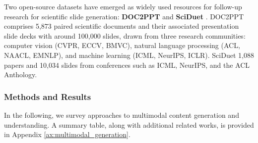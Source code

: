 Two open-source datasets have emerged as widely used resources for follow-up research for scientific slide generation: \textbf{DOC2PPT} \citep{Fu2021DOC2PPTAP} and \textbf{SciDuet} \citep{sun-etal-2021-d2s}. DOC2PPT \citep{Fu2021DOC2PPTAP}  comprises 5,873 paired scientific documents and their associated presentation slide decks with around  100,000 slides, drawn from three research communities: computer vision (CVPR, ECCV, BMVC), natural language processing (ACL, NAACL, EMNLP), and machine learning (ICML, NeurIPS, ICLR). SciDuet \citep{sun-etal-2021-d2s} %
1,088 papers and 10,034 slides from conferences such as ICML, NeurIPS, and the ACL Anthology. %

\subsubsection{Methods and Results} In the following, we survey approaches to multimodal content generation and understanding. 
A summary table, along with additional related works, is provided in Appendix \ref{ax:multimodal_generation}.
 
